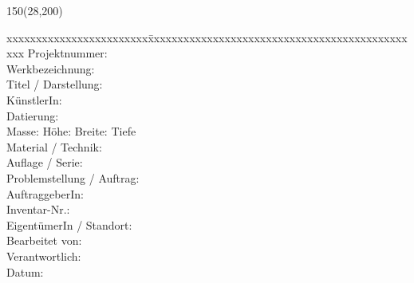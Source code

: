 \begin{titlepage}
\begin{flushleft}
\begin{textblock}{150}(28,200)
\fontsize{10pt}{12pt}\selectfont
\begin{tabbing}
xxxxxxxxxxxxxxxxxxxxxxxx\=xxxxxxxxxxxxxxxxxxxxxxxxxxxxxxxxxxxxxxxxxxxxxxx \kill
Projektnummer: 				\>           \\
Werkbezeichnung: \>          \\
Titel / Darstellung: \>             \\
KünstlerIn: \>                       \\
Datierung: \>						\\
Masse: \> Höhe: Breite: Tiefe  				\\
Material / Technik: \>								\\
Auflage / Serie: \>										\\
Problemstellung / Auftrag: \>						\\
AuftraggeberIn: \>										\\
Inventar-Nr.: \>											\\
EigentümerIn / Standort: \>									\\
Bearbeitet von: \>													\\
Verantwortlich: \>												\\
Datum: \>														\\

\end{tabbing}

\end{textblock}
\end{flushleft}



\end{titlepage}
